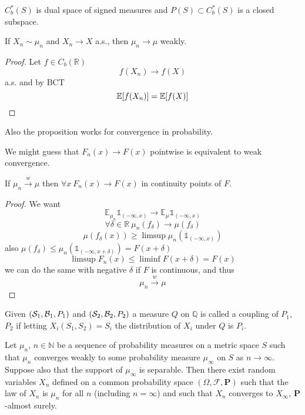 $C_b^*(S)$ is dual space of signed measures and $P(S) \subset C_b^*(S)$ is a closed subspace.
\begin{prop}
	If $X_n\sim \mu_n$ and $X_n \to X$ a.s., then $\mu_n \to \mu$ weakly.
	\begin{proof}
		Let $f\in C_b(\mathbb{R})$
		$$f(X_n) \to f(X) $$
		a.s. and by BCT
		$$\mathbb{E} \qty[f(X_n)] = \mathbb{E} [f(X)]$$
	\end{proof}

Also the proposition works for convergence in probability.
\end{prop}

We might guess that $F_n(x) \to F(x)$ pointwise is equivalent to weak convergence.

\begin{theorem}
	If $\mu_n \stackrel{w}{\to} \mu$ then $\forall x \: F_n(x) \to F(x) $ in continuity points of $F$.
	
	\begin{proof}
		We want
		$$\mathbb{E}_{\mu_n} \mathds{1}_{(-\infty, x) } \to \mathbb{E}_{\mu} \mathds{1}_{(-\infty, x) }$$
		$$\forall \delta \in \mathbb{R} \: \mu_n(f_\delta) \to \mu(f_\delta)$$
		$$\mu(f_\delta(x)) \geq \limsup \mu_n(\mathds{1}_{(-\infty, x)})$$
		also $\mu(f_\delta ) \leq \mu_n(\mathds{1}_{(-\infty, x+\delta)}) = F(x+\delta)$
		$$\limsup F_n(x) \leq \liminf F(x+\delta)=F(x)$$
		we can do the same with negative $\delta$ if $F$ is continuous, and thus
		$$\mu_n \stackrel{w}{\to} \mu$$
	\end{proof}
\end{theorem}

\begin{definition}
	Given $\qty(\mathcal{S}_1, \mathcal{B}_1, P_1)$ and $\qty(\mathcal{S}_2, \mathcal{B}_2, P_2)$ a measure $Q$ on $\mathbb{Q}$ is called a coupling of $P_1$, $P_2$ if letting $X_i(S_1,S_2) = S_i$ the distribution of $X_i$ under $Q$ is $P_i$.
\end{definition}
\begin{theorem}
	
	Let $\mu_n$, $n \in \mathbb{N}$ be a sequence of probability measures on a metric space $S$ such that $\mu_n$ converges weakly to some probability measure $\mu_\infty$ on $S$ as $n \to \infty$.  Suppose also that the support of $\mu_\infty$ is separable. Then there exist random variables $X_n$ defined on a common probability space $(\Omega,\mathcal{F},\mathbf{P})$ such that the law of $X_n$ is $\mu_n$ for all $n$ (including $n=\infty$) and such that $X_n$ converges to $X_\infty$, $\mathbf{P}$-almost surely.
\end{theorem}

